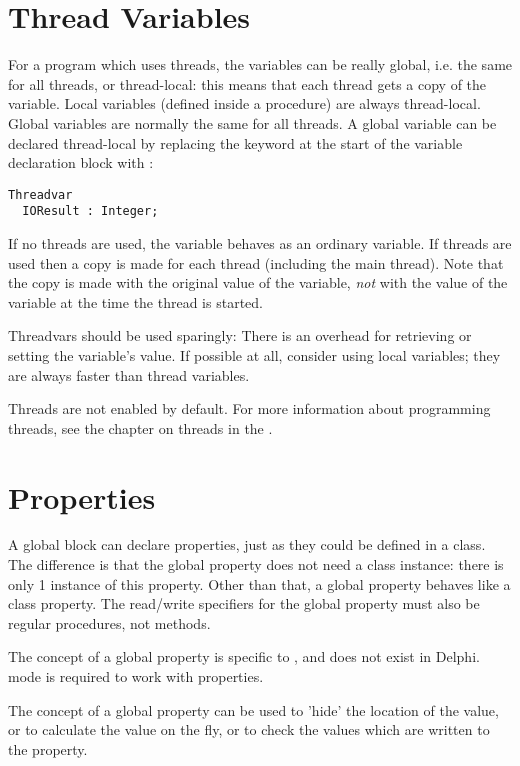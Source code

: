 \section{Thread Variables}
For a program which uses threads, the variables can be really global, i.e. the same for all 
threads, or thread-local: this means that each thread gets a copy of the variable. 
Local variables (defined inside a procedure) are always thread-local. Global 
variables are normally the same for all threads. A global variable can be 
declared thread-local by replacing the  keyword at the start of the 
variable declaration block with :
\begin{verbatim}
Threadvar
  IOResult : Integer;
\end{verbatim}
If no threads are used, the variable behaves as an ordinary variable. 
If threads are used then a copy is made 
for each thread (including the main thread). Note that the copy is 
made with the original value  of the variable, {\em not} with the 
value of the variable at the time the thread is started.

Threadvars should be used sparingly: There is an overhead for retrieving 
or setting the variable's value. If possible at all, consider using local 
variables; they are always faster than thread variables.

Threads are not enabled by default. For more information about programming 
threads, see the chapter on threads in the \progref.

\section{Properties}
A global block can declare properties, just as they could be defined in a
class. The difference is that the global property does not need a class
instance: there is only 1 instance of this property. Other than that, a
global property behaves like a class property. The read/write specifiers for
the global property must also be regular procedures, not methods.

The concept of a global property is specific to \fpc, and does not exist in
Delphi.  mode is required to work with properties.

The concept of a global property can be used to 'hide' the location of the
value, or to calculate the value on the fly, or to check the values which
are written to the property.

